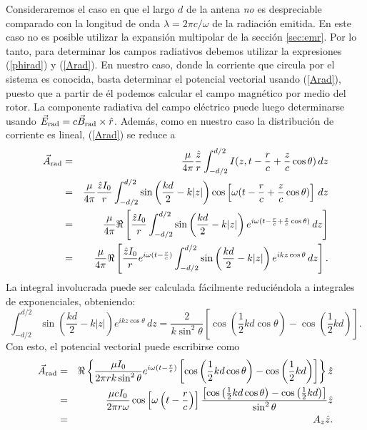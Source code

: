 Consideraremos el caso en que el largo $d$ de la antena \textit{no} es despreciable comparado con la longitud de onda $\lambda=2\pi c/\omega$ de la radiación emitida. En este caso no es posible utilizar la expansión multipolar de la sección \ref{sec:emr}. Por lo tanto, para determinar los campos radiativos debemos utilizar la expresiones  (\ref{phirad}) y (\ref{Arad}). En nuestro caso, donde la corriente que circula por el sistema es conocida, basta determinar el potencial vectorial usando (\ref{Arad}), puesto que a partir de él podemos calcular el campo magnético por medio del rotor. La componente radiativa del campo eléctrico puede luego determinarse usando $\vec{E}_{\rm rad}=c\vec{B}_{\rm rad}\times\hat{r}$. Además, como en nuestro caso la distribución de corriente es lineal, (\ref{Arad}) se reduce a
\begin{eqnarray}
 \vec{A}_{\rm rad}&=&\frac{\mu}{4\pi}\frac{\hat{z}}{r}\int_{-d/2}^{d/2}I(z,t-\frac{r}{c}+\frac{z}{c}\cos\theta)\,dz \\
&=&\frac{\mu}{4\pi}\frac{\hat{z}I_0}{r}\int_{-d/2}^{d/2}\sin\left(\frac{kd}{2}-k|z|\right)\cos\left[\omega (t-\frac{r}{c}+\frac{z}{c}\cos\theta)\right]\,dz \\
&=&\frac{\mu}{4\pi}\Re\left[\frac{\hat{z}I_0}{r}\int_{-d/2}^{d/2}\sin\left(\frac{kd}{2}-k|z|\right)e^{i\omega (t-\frac{r}{c}+\frac{z}{c}\cos\theta)}\,dz \right]\\
&=&\frac{\mu}{4\pi}\Re\left[\frac{\hat{z}I_0}{r}e^{i\omega(t-\frac{r}{c})}\int_{-d/2}^{d/2}\sin\left(\frac{kd}{2}-k|z|\right)e^{ikz\cos\theta}\,dz \right] .
\end{eqnarray}
La integral involucrada puede ser calculada fácilmente reduciéndola a integrales de exponenciales, obteniendo:
\begin{equation}
 \int_{-d/2}^{d/2}\sin\left(\frac{kd}{2}-k|z|\right)e^{ikz\cos\theta}\,dz=\frac{2}{k\sin^2\theta}\left[\cos\left(\frac{1}{2}kd\cos\theta\right)-\cos\left(\frac{1}{2}kd\right)\right] .
\end{equation}
Con esto, el potencial vectorial puede escribirse como
\begin{eqnarray}
 \vec{A}_{\rm rad}&=&
\Re\left\lbrace\frac{\mu I_0}{2\pi rk\sin^2\theta}e^{i\omega(t-\frac{r}{c})}\left[\cos\left(\frac{1}{2}kd\cos\theta\right)-\cos\left(\frac{1}{2}kd\right)\right] \right\rbrace\hat{z}\\
&=&\frac{\mu cI_0}{2\pi r\omega}\cos\left[\omega\left(t-\frac{r}{c}\right)\right]\frac{\left[\cos\left(\frac{1}{2}kd\cos\theta\right)-\cos\left(\frac{1}{2}kd\right)\right]}{\sin^2\theta}\hat{z} \\
&=&A_z\hat{z}.
\end{eqnarray}
